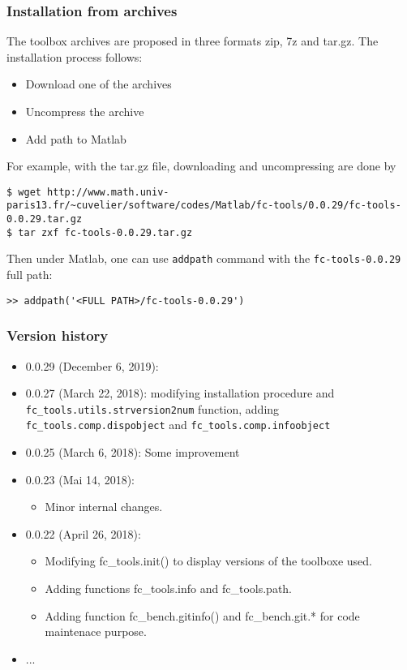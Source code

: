 
\subsubsection{Installation from archives}
The toolbox archives are proposed in three formats zip, 7z and tar.gz. The installation process follows:
\begin{itemize}
\item Download one of the archives
\item Uncompress the archive
\item Add path to Matlab
\end{itemize}

For example, with the tar.gz file, downloading and uncompressing are done by 
\begin{verbatim}
$ wget http://www.math.univ-paris13.fr/~cuvelier/software/codes/Matlab/fc-tools/0.0.29/fc-tools-0.0.29.tar.gz
$ tar zxf fc-tools-0.0.29.tar.gz
\end{verbatim}
Then under Matlab, one can use \texttt{addpath} command with the \texttt{fc-tools-0.0.29} full path:
\begin{verbatim}
>> addpath('<FULL PATH>/fc-tools-0.0.29')
\end{verbatim}

\subsubsection{Version history}

\begin{itemize}
\item 0.0.29 (December 6, 2019):  
\item 0.0.27 (March 22, 2018): modifying installation procedure and \verb+fc_tools.utils.strversion2num+ function, adding \verb+fc_tools.comp.dispobject+
and \verb+fc_tools.comp.infoobject+
\item 0.0.25 (March 6, 2018): Some improvement
\item 0.0.23 (Mai 14, 2018):
\begin{itemize}
\item Minor internal changes.
\end{itemize}
\item 0.0.22 (April 26, 2018): 
\begin{itemize}
\item Modifying fc_tools.init() to display versions of the toolboxe used.
\item Adding functions fc_tools.info and fc_tools.path.
\item Adding function fc_bench.gitinfo() and fc_bench.git.* for code maintenace purpose.
\end{itemize}
\item ...
\end{itemize}
 
